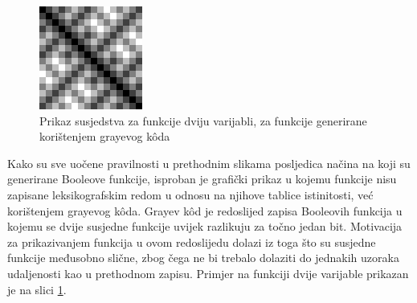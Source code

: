 \begin{figure}[ht!] 
    \centering
    \includegraphics[width=.4\textwidth]{img/function_gray_2}
    \captionsetup{justification=centering}
    \caption{Prikaz susjedstva za funkcije dviju varijabli, za funkcije generirane korištenjem grayevog k\^oda}
    \label{fig:function_gray_2}
\end{figure}
Kako su sve uočene pravilnosti u prethodnim slikama posljedica načina na koji su generirane Booleove funkcije, isproban je grafički prikaz u kojemu funkcije nisu zapisane leksikografskim redom u odnosu na njihove tablice istinitosti, već korištenjem grayevog k\^oda.
Grayev k\^od je redoslijed zapisa Booleovih funkcija u kojemu se dvije susjedne funkcije uvijek razlikuju za točno jedan bit. 
Motivacija za prikazivanjem funkcija u ovom redoslijedu dolazi iz toga što su susjedne funkcije međusobno slične, zbog čega ne bi trebalo dolaziti do jednakih uzoraka udaljenosti kao u prethodnom zapisu.
Primjer na funkciji dvije varijable prikazan je na slici \ref{fig:function_gray_2}.

